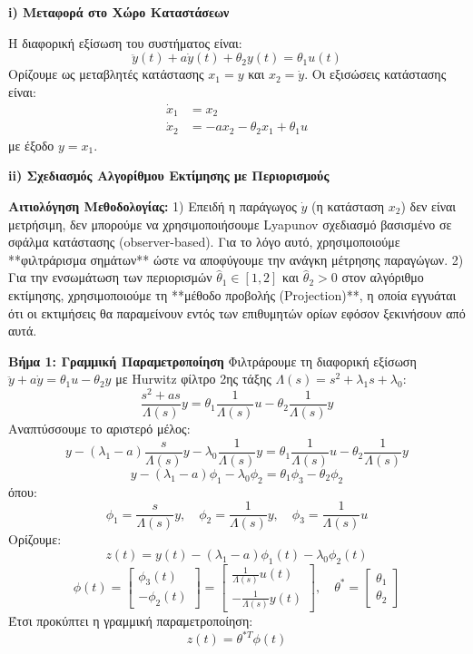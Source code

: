 \documentclass[a4paper,11pt]{article}
\begin{document}
\begin{answer}
\textbf{i) Μεταφορά στο Χώρο Καταστάσεων}

Η διαφορική εξίσωση του συστήματος είναι:
\[ \ddot{y}(t) + a \dot{y}(t) + \theta_2 y(t) = \theta_1 u(t) \]
Ορίζουμε ως μεταβλητές κατάστασης $x_1 = y$ και $x_2 = \dot{y}$. Οι εξισώσεις κατάστασης είναι:
\begin{align*}
    \dot{x}_1 &= x_2 \\
    \dot{x}_2 &= -a x_2 - \theta_2 x_1 + \theta_1 u
\end{align*}
με έξοδο $y = x_1$.

\textbf{ii) Σχεδιασμός Αλγορίθμου Εκτίμησης με Περιορισμούς}

\textbf{Αιτιολόγηση Μεθοδολογίας:}
1) Επειδή η παράγωγος $\dot{y}$ (η κατάσταση $x_2$) δεν είναι μετρήσιμη, δεν μπορούμε να χρησιμοποιήσουμε Lyapunov σχεδιασμό βασισμένο σε σφάλμα κατάστασης (observer-based). Για το λόγο αυτό, χρησιμοποιούμε **φιλτράρισμα σημάτων** ώστε να αποφύγουμε την ανάγκη μέτρησης παραγώγων.
2) Για την ενσωμάτωση των περιορισμών $\hat{\theta}_1 \in [1,2]$ και $\hat{\theta}_2 > 0$ στον αλγόριθμο εκτίμησης, χρησιμοποιούμε τη **μέθοδο προβολής (Projection)**, η οποία εγγυάται ότι οι εκτιμήσεις θα παραμείνουν εντός των επιθυμητών ορίων εφόσον ξεκινήσουν από αυτά.

\textbf{Βήμα 1: Γραμμική Παραμετροποίηση}
Φιλτράρουμε τη διαφορική εξίσωση $\ddot{y} + a \dot{y} = \theta_1 u - \theta_2 y$ με Hurwitz φίλτρο 2ης τάξης $\Lambda(s) = s^2 + \lambda_1 s + \lambda_0$:
\[ \frac{s^2 + a s}{\Lambda(s)} y = \theta_1 \frac{1}{\Lambda(s)} u - \theta_2 \frac{1}{\Lambda(s)} y \]
Αναπτύσσουμε το αριστερό μέλος:
\[ y - (\lambda_1 - a) \frac{s}{\Lambda(s)} y - \lambda_0 \frac{1}{\Lambda(s)} y = \theta_1 \frac{1}{\Lambda(s)} u - \theta_2 \frac{1}{\Lambda(s)} y \]
\[ y - (\lambda_1 - a) \phi_1 - \lambda_0 \phi_2 = \theta_1 \phi_3 - \theta_2 \phi_2 \]
όπου:
\[ \phi_1 = \frac{s}{\Lambda(s)} y, \quad \phi_2 = \frac{1}{\Lambda(s)} y, \quad \phi_3 = \frac{1}{\Lambda(s)} u \]
Ορίζουμε:
\[ z(t) = y(t) - (\lambda_1 - a) \phi_1(t) - \lambda_0 \phi_2(t) \]
\[ \phi(t) = \begin{bmatrix} \phi_3(t) \\ -\phi_2(t) \end{bmatrix} = \begin{bmatrix} \frac{1}{\Lambda(s)} u(t) \\ -\frac{1}{\Lambda(s)} y(t) \end{bmatrix}, \quad \theta^* = \begin{bmatrix} \theta_1 \\ \theta_2 \end{bmatrix} \]
Έτσι προκύπτει η γραμμική παραμετροποίηση:
\[ z(t) = \theta^{*T} \phi(t) \]


\end{answer}
\end{document}
